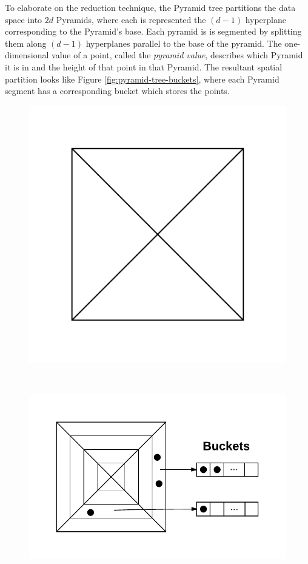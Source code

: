 To elaborate on the reduction technique, the Pyramid tree partitions the data space into $2d$ Pyramids, where each is represented the $(d - 1)$ hyperplane corresponding to the Pyramid's base. Each pyramid is is segmented by splitting them along $(d-1)$ hyperplanes parallel to the base of the pyramid. The one-dimensional value of a point, called the \textit{pyramid value}, describes which Pyramid it is in and the height of that point in that Pyramid. The resultant spatial partition looks like Figure \ref{fig:pyramid-tree-buckets}, where each Pyramid segment has a corresponding bucket which stores the points.

\begin{figure}
		\begin{center}
			\begin{subfloat}{%
				\includegraphics[scale=0.5]{figures/pyramid_tree_partition.pdf}
			}
			\end{subfloat}~
			\begin{subfloat} {%
				\includegraphics[scale=0.5]{figures/pyramid_tree_buckets.pdf}
			}
			\end{subfloat}
		\end{center}


\end{figure}

